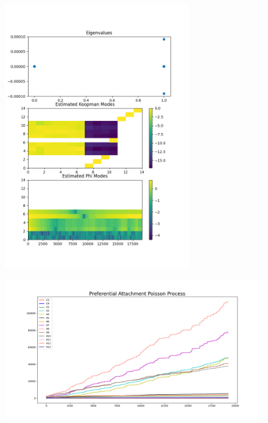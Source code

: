 \begin{figure}
    \includegraphics[width=8cm]{Images/m1k300eigen.png}
    \centering
\end{figure}

\clearpage

\begin{figure}
    \includegraphics[width=12cm]{Images/poissonprocess_pref_attach_2.png}
    \centering
\end{figure}

